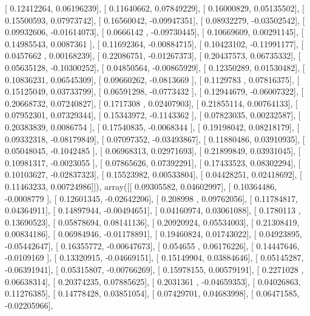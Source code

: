 \documentclass{article}
\begin{document}
       [ 0.12412264,  0.06196239],
       [ 0.11640662,  0.07849229],
       [ 0.16000829,  0.05135502],
       [ 0.15500593,  0.07973742],
       [ 0.16560042, -0.09947351],
       [ 0.08932279, -0.03502542],
       [ 0.09932606, -0.01614073],
       [ 0.0666142 , -0.09730445],
       [ 0.10669609,  0.00291145],
       [ 0.14985543,  0.0087361 ],
       [ 0.11692364, -0.00884715],
       [ 0.10423102, -0.11991177],
       [ 0.0457662 ,  0.00168239],
       [ 0.22086751, -0.01267373],
       [ 0.20437573,  0.06735332],
       [ 0.05635128, -0.10300252],
       [ 0.04850564, -0.00865929],
       [ 0.12350289,  0.01530482],
       [ 0.10836231,  0.06545309],
       [ 0.09660262, -0.0813669 ],
       [ 0.1129783 ,  0.07816375],
       [ 0.15125049,  0.03733799],
       [ 0.06591298, -0.0773432 ],
       [ 0.12944679, -0.06007322],
       [ 0.20668732,  0.07240827],
       [ 0.1717308 ,  0.02407903],
       [ 0.21855114,  0.00764133],
       [ 0.07952301,  0.07329344],
       [ 0.15343972, -0.1143362 ],
       [ 0.07823035,  0.00232587],
       [ 0.20383839,  0.0086754 ],
       [ 0.17540835, -0.0068344 ],
       [ 0.19198042,  0.08218179],
       [ 0.09332318, -0.08179849],
       [ 0.07097352, -0.03493867],
       [ 0.11880486,  0.03910935],
       [ 0.05048045, -0.1042485 ],
       [ 0.06968313,  0.02971693],
       [ 0.21899849,  0.03931045],
       [ 0.10981317, -0.0023055 ],
       [ 0.07865626,  0.07392291],
       [ 0.17433523,  0.08302294],
       [ 0.10103627, -0.02837323],
       [ 0.15523982,  0.00533804],
       [ 0.04428251,  0.02418692],
       [ 0.11463233,  0.00724986]]), array([[ 0.09305582,  0.04602997],
       [ 0.10364486, -0.0008779 ],
       [ 0.12601345, -0.02642206],
       [ 0.208998  ,  0.09762056],
       [ 0.11784817,  0.04364911],
       [ 0.14897944, -0.00494651],
       [ 0.04160974,  0.03061088],
       [ 0.1780113 ,  0.13690523],
       [ 0.05878694,  0.08141136],
       [ 0.20920924,  0.05534003],
       [ 0.21308419,  0.00834186],
       [ 0.06984946, -0.01178891],
       [ 0.19460824,  0.01743022],
       [ 0.04923895, -0.05442647],
       [ 0.16355772, -0.00647673],
       [ 0.054655  ,  0.06176226],
       [ 0.14447646, -0.0109169 ],
       [ 0.13320915, -0.04669151],
       [ 0.15149904,  0.03884646],
       [ 0.05145287, -0.06391941],
       [ 0.05315807, -0.00766269],
       [ 0.15978155,  0.00579191],
       [ 0.2271028 ,  0.06638314],
       [ 0.20374235,  0.07885625],
       [ 0.2031361 , -0.04659353],
       [ 0.04026863,  0.11276385],
       [ 0.14778428,  0.03851054],
       [ 0.07429701,  0.04683998],
       [ 0.06471585, -0.02205966],
\end{document}
